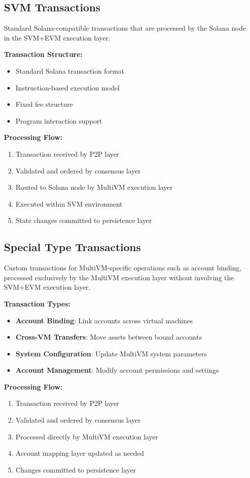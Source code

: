 \documentclass[11pt,a4paper]{article}
\begin{document}
\subsection{SVM Transactions}
Standard Solana-compatible transactions that are processed by the Solana node in the SVM+EVM execution layer.

\textbf{Transaction Structure:}
\begin{itemize}
    \item Standard Solana transaction format
    \item Instruction-based execution model
    \item Fixed fee structure
    \item Program interaction support
\end{itemize}

\textbf{Processing Flow:}
\begin{enumerate}
    \item Transaction received by P2P layer
    \item Validated and ordered by consensus layer
    \item Routed to Solana node by MultiVM execution layer
    \item Executed within SVM environment
    \item State changes committed to persistence layer
\end{enumerate}

\subsection{Special Type Transactions}
Custom transactions for MultiVM-specific operations such as account binding, processed exclusively by the MultiVM execution layer without involving the SVM+EVM execution layer.

\textbf{Transaction Types:}
\begin{itemize}
    \item \textbf{Account Binding}: Link accounts across virtual machines
    \item \textbf{Cross-VM Transfers}: Move assets between bound accounts
    \item \textbf{System Configuration}: Update MultiVM system parameters
    \item \textbf{Account Management}: Modify account permissions and settings
\end{itemize}

\textbf{Processing Flow:}
\begin{enumerate}
    \item Transaction received by P2P layer
    \item Validated and ordered by consensus layer
    \item Processed directly by MultiVM execution layer
    \item Account mapping layer updated as needed
    \item Changes committed to persistence layer
\end{enumerate}
\end{document}
